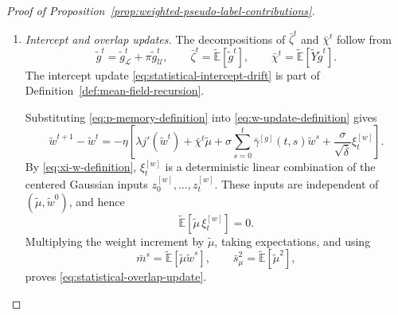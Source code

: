 \begin{proof}[Proof of Proposition~\ref{prop:weighted-pseudo-label-contributions}]
\begin{enumerate}[label=(\roman*),wide]
    \item \emph{Intercept and overlap updates.}
    The decompositions of $\bar\zeta^t$ and $\bar\chi^t$
    follow from
    \[
        \tilde g^t
        =
        \tilde g_{\mathcal L}^t
        +
        \pi\tilde g_{\mathcal U}^t,
        \qquad
        \bar\zeta^t=\tilde{\mathbb E}[\tilde g^t],
        \qquad
        \bar\chi^t=\tilde{\mathbb E}[\tilde Y\tilde g^t].
    \]
    The intercept update
    \eqref{eq:statistical-intercept-drift} is part of
    Definition~\ref{def:mean-field-recursion}.

    Substituting \eqref{eq:p-memory-definition} into
    \eqref{eq:w-update-definition} gives
    \[
        \tilde w^{t+1}-\tilde w^t
        =
        -\eta\left[
            \lambda j'(\tilde w^t)
            +
            \bar\chi^t\tilde\mu
            +
            \sigma\sum_{s=0}^{t}
                \bar\gamma^{[g]}(t,s)\tilde w^s
            +
            \frac{\sigma}{\sqrt{\bar\delta}}\xi_t^{[w]}
        \right].
    \]
    By \eqref{eq:xi-w-definition}, $\xi_t^{[w]}$ is a
    deterministic linear combination of the centered
    Gaussian inputs $z_0^{[w]},\ldots,z_t^{[w]}$.
    These inputs are independent of
    $(\tilde\mu,\tilde w^0)$, and hence
    \[
        \tilde{\mathbb E}[\tilde\mu\,\xi_t^{[w]}]=0.
    \]
    Multiplying the weight increment by $\tilde\mu$,
    taking expectations, and using
    \[
        \bar m^s
        =
        \tilde{\mathbb E}[\tilde\mu\tilde w^s],
        \qquad
        \bar s_\mu^2
        =
        \tilde{\mathbb E}[\tilde\mu^2],
    \]
    proves \eqref{eq:statistical-overlap-update}.
\end{enumerate}
\end{proof}

